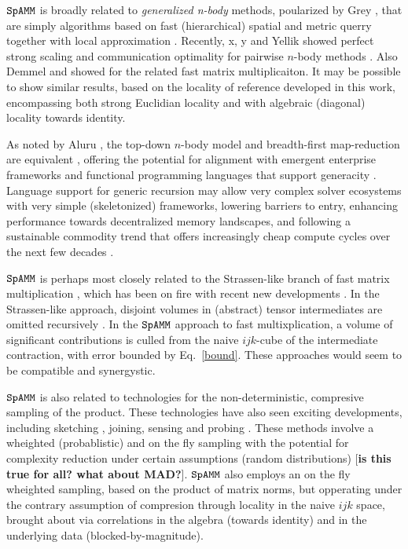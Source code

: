 \documentclass[letterpaper,twocolumn,amsmath,amsfont,amssymb,english,aps,jcp,preprintnumbers,groupaddress,nofootinbib,tightenlines]{revtex4}
\begin{document}
$\tt SpAMM$ is broadly related to {\em generalized n-body} methods, poularized by Grey \cite{},  
that are simply algorithms based on fast (hierarchical) spatial and metric querry \cite{Sammet} together with local approximation \cite{}.  
Recently, x, y  and Yellik showed perfect strong scaling and communication optimality 
for pairwise $n$-body methods \cite{Warren Salmon, Yellik}.  Also Demmel and showed  for the related fast matrix multiplicaiton.
It may be possible to show similar results, based on the locality of reference developed in this work, encompassing both 
strong Euclidian locality and with algebraic (diagonal) locality towards identity.  

As noted by Aluru \cite{}, the top-down $n$-body model and breadth-first map-reduction are equivalent \cite{}, offering
the potential for alignment with emergent enterprise frameworks \cite{} and functional programming 
languages that support generacity \cite{}. Language support for generic recursion may allow very complex solver ecosystems 
with very simple (skeletonized) frameworks, lowering barriers to entry, enhancing performance towards decentralized memory landscapes, 
and following a sustainable commodity trend \cite{softwaresustainanbilty} that offers 
increasingly cheap compute cycles over the next few decades \cite{}. 

$\tt SpAMM$ is perhaps most closely related to the Strassen-like branch of fast matrix multiplication \cite{},  
which has been on fire with recent new developments \cite{}.  In the Strassen-like approach, disjoint volumes in (abstract) tensor 
intermediates are omitted recursively \cite{}.  In the $\tt SpAMM$ approach to fast multixplication, a volume of
significant contributions is culled from the naive $ijk$-cube of the intermediate contraction, 
with error bounded by Eq.~\ref{bound}.  These approaches would seem to be compatible and synergystic.

$\tt SpAMM$ is also related to technologies for the non-deterministic,  compresive sampling of the product.  These 
technologies have also seen exciting developments, including  sketching \cite{Kutzkov2012, Pagh2013}, joining, sensing and probing \cite{}.
These methods involve a wheighted (probablistic) and on the fly sampling with the potential for complexity reduction under
certain assumptions (random distributions) [{\bf is this true for all? what about MAD?}].  
$\tt SpAMM$ also employs an on the fly wheighted sampling, based on the product of matrix norms, 
but opperating under the contrary assumption of compresion through locality in the naive $ijk$ space, brought about 
via correlations in the algebra (towards identity) and in the underlying data (blocked-by-magnitude).
\end{document}

